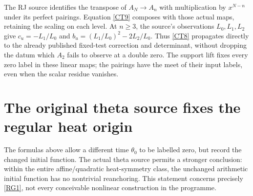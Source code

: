 \documentclass[11pt,a4paper]{article}
\theoremstyle{definition}\newtheorem{definition}[theorem]{Definition}
\begin{document}
The RJ source identifies the transpose of $A_N\to A_n$ with multiplication by $x^{N-n}$ under its perfect pairings. Equation \eqref{CT9} composes with those actual maps, retaining the scaling on each level. At $n\ge3$, the source's observations $L_0,L_1,L_2$ give
$c_u=-L_1/L_0$ and $b_u=(L_1/L_0)^2-2L_2/L_0$. Thus \eqref{CT8} propagates directly to the already published fixed-test correction and determinant, without dropping the datum which $A_2$ fails to observe at a double zero. The support lift fixes every zero label in these linear maps; the pairings have the meet of their input labels, even when the scalar residue vanishes.

\section{The original theta source fixes the regular heat origin}
The formulas above allow a different time $\theta_0$ to be labelled zero, but record the changed initial function. The actual theta source permits a stronger conclusion: within the entire affine/quadratic heat-symmetry class, the unchanged arithmetic initial function has no nontrivial reanchoring. This statement concerns precisely \eqref{RG1}, not every conceivable nonlinear construction in the programme.
\end{document}
